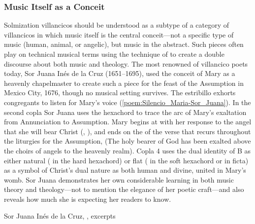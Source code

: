 \subsubsection{Music Itself as a Conceit}

Solmization villancicos should be understood as a subtype of a category of
villancicos in which music itself is the central conceit---not a specific type
of music (human, animal, or angelic), but music in the abstract.
Such pieces often play on technical musical terms using the technique of
 to create a double discourse about both music and theology.
The most renowned of villancico poets today, Sor Juana Inés de la Cruz
(1651--1695), used the conceit of Mary as a heavenly chapelmaster to create
such a piece for the feast of the Assumption in Mexico City, 1676, though no
musical setting survives.%
    \Autocite[, ]{SorJuana:VC} 
The estribillo exhorts congregants to listen for Mary's voice
(\cref{poem:Silencio_Maria-Sor_Juana}).
In the second copla Sor Juana uses the hexachord to trace the arc of Mary's
exaltation from Annunciation to Assumption. 
Mary begins at  with her response to the angel that she will bear
Christ (, ), and ends on the
 of the verse that recurs throughout the liturgies for the Assumption,
 (The holy bearer of God has been exalted above the choirs of angels to
the heavenly realm).
Copla 4 uses the dual identity of B as either natural ( in the hard
hexachord) or flat ( in the soft hexachord or in ficta) as a symbol of
Christ's dual nature as both human and divine, united in Mary's womb.
Sor Juana demonstrates her own considerable learning in both music theory and
theology---not to mention the elegance of her poetic craft---and also reveals
how much she is expecting her readers to know.%
    \Autocites
    {Stevenson:SorJuanaMusicalRapports}
    {Tenorio:SorJuana}

{Sor Juana Inés de la Cruz, ,
excerpts}

